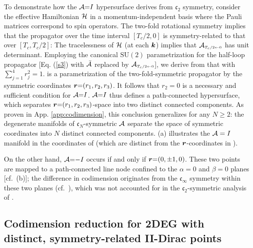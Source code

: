 \documentclass[aps, showpacs, twocolumn, notitlepage, superscriptaddress]{revtex4-1}
\begin{document}
To demonstrate how the ${\cal A}{=}I$ hypersurface derives from $\mathfrak{c}_2$ symmetry, consider  the effective Hamiltonian ${\cal H}$ 
in a momentum-independent basis where the Pauli matrices correspond to spin operators. The two-fold rotational symmetry 
implies that the propagator over the time interval $[T_c/2,0]$ is symmetry-related to that over $[T_c,T_c/2]$:
The tracelessness of ${\cal H}$ (at each $\boldsymbol{k}$) implies that  ${{\cal A}}_{\scriptscriptstyle{T_c/2\leftarrow 0}}$  has unit determinant. Employing the canonical $\text{SU}(2)$ parametrization for the half-loop propagator [Eq. (\ref{s3}) with ${\cal \bar{A}}$ replaced by ${{\cal A}}_{\scriptscriptstyle{T_c/2\leftarrow 0}}$], we derive from  that
with $\sum_{j=1}^4r_j^2{=}1$.  is a parametrization of the two-fold-symmetric propagator by the symmetric coordinates $\boldsymbol{r}{=}(r_1,r_2,r_3)$. It follows that $r_2{=}0$ is a necessary and sufficient condition for ${\cal A}{=}I$.  ${\cal A}{=}I$ thus defines a path-connected hypersurface, which separates $\boldsymbol{r}{=}(r_1,r_2,r_3)$-space into two distinct connected components. As proven in App. \ref{app:codimension}, this conclusion generalizes for any $N{\geq}2$: the degenerate manifolds of $\mathfrak{c}_N$-symmetric ${\cal A}$ separate the space of symmetric coordinates into $N$ distinct connected components. (a) illustrates the ${\cal A}=I$ manifold {in the coordinates of   (which are distinct from the $\boldsymbol{r}$-coordinates in ).} 

On the other hand, ${\cal A}{=}{-}I$ occurs if and only if $\boldsymbol{r}{=}(0,{\pm} 1,0)$. These two points are mapped to a path-connected line node confined to the $\alpha{=}0$ and $\beta{=}0$ planes [cf.\ (b)]; the difference in codimension originates from the $\mathfrak{c}_{\infty}$ symmetry within these two planes (cf.\ ), which was not accounted for in the $\mathfrak{c}_2$-symmetric analysis of .

\subsection{Codimension reduction for 2DEG with distinct, symmetry-related II-Dirac points}\label{sec:rotsymmbreakdown}
\end{document}
